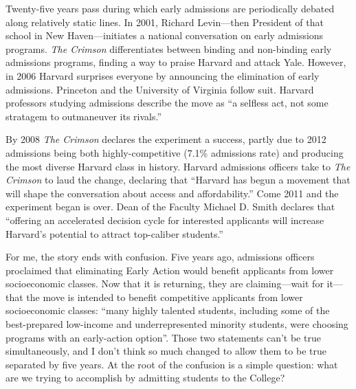 %

Twenty-five years pass during which early admissions are periodically debated
along relatively static lines. In 2001, Richard Levin---then President of
that school in New Haven---initiates a national conversation on early
admissions programs. \textit{The Crimson} differentiates between binding and
non-binding early admissions programs, finding a way to praise Harvard and
attack Yale. However, in 2006 Harvard surprises everyone by announcing the
elimination of early admissions. Princeton and the University of Virginia
follow suit. Harvard professors studying admissions describe the move as ``a
selfless act, not some stratagem to outmaneuver its rivals.''

By 2008 \textit{The Crimson} declares the experiment a success, partly due to
2012 admissions being both highly-competitive (7.1\% admissions rate) and
producing the most diverse Harvard class in history. Harvard admissions
officers take to \textit{The Crimson} to laud the change, declaring that
``Harvard has begun a movement that will shape the conversation about access
and affordability.'' Come 2011 and the experiment began is over. Dean of the
Faculty Michael D. Smith declares that ``offering an accelerated decision
cycle for interested applicants will increase Harvard’s potential to attract
top-caliber students.''

For me, the story ends with confusion. Five years ago, admissions officers
proclaimed that eliminating Early Action would benefit applicants from lower
socioeconomic classes. Now that it is returning, they are claiming---wait for
it---that the move is intended to benefit competitive applicants from lower
socioeconomic classes: ``many highly talented students, including some of the
best-prepared low-income and underrepresented minority students, were
choosing programs with an early-action option''. Those two statements can't
be true simultaneously, and I don't think so much changed to allow them to be
true separated by five years. At the root of the confusion is a simple
question: what are we trying to accomplish by admitting students to the
College?

